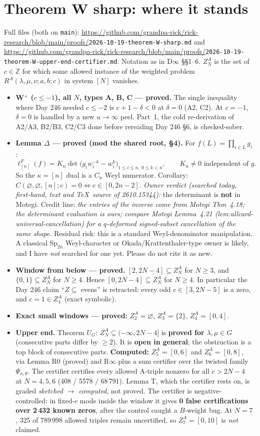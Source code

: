 \documentclass[10pt]{article}
\newcommand{\RR}{\url{https://github.com/grandpa-rick/rick-research/blob/main/proofs/}}
\begin{document}
\section{Theorem W sharp: where it stands}
Full files (both on \texttt{main}):
\RR\texttt{2026-10-19-theorem-W-sharp.md} and \RR\texttt{2026-10-19-theorem-W-upper-end-certifier.md}.
Notation as in D$\infty$ \S\S1--6. $Z^A_N$ is the set of $c\in\mathbb Z$ for which some allowed instance of the weighted problem $R^A(\lambda,\mu,\nu;a,b;c)$ in system $[N]$ vanishes.
\begin{itemize}
\item \textbf{W$^+$ ($c\le-1$), all $N$, types A, B, C --- proved.} The single inequality where Day 246 needed $c\le-2$ is $c+1-\delta<0$ at $\delta=0$ (A2, C2). At $c=-1$, $\delta=0$ is handled by a new $u\to\infty$ peel. Part~1, the cold re-derivation of A2/A3, B2/B3, C2/C3 done before rereading Day 246 \S6, is checked-sober.
\item \textbf{Lemma $\Delta$ --- proved (mod the shared root, \S4).} For $f(L)=\prod_{i\in L}g_i$:
\[\ell^F_{[n]}(f)=K_n\det\big(g_iw_i^{-k}-w_i^{k}\big)_{1\le i\le n,\ 0\le k<n},\qquad K_n\neq0 \text{ independent of } g.\]
So the $\kappa=[n]$ dual is a $C_n$ Weyl numerator. Corollary: $C(\varnothing,\varnothing,[n];c)=0\iff c\in[0,2n-2]$.
\emph{Owner verdict (searched today, first-hand, text and \TeX\ source of 2610.15344):} the determinant is \textbf{not} in Motegi. Credit line: \emph{the entries of the inverse come from Motegi Thm~4.18; the determinant evaluation is ours; compare Motegi Lemma~4.21 (lem:allcard-universal-cancellation) for a $q$-deformed signed-subset cancellation of the same shape.} Residual risk: this is a standard Weyl-denominator manipulation. A classical $\mathrm{Sp}_{2n}$ Weyl-character or Okada/Krattenthaler-type owner is likely, and I have \emph{not} searched for one yet. Please do not cite it as new.
\item \textbf{Window from below --- proved.} $[2,2N-4]\subseteq Z^A_N$ for $N\ge3$, and $\{0,1\}\subseteq Z^A_N$ for $N\ge4$. Hence $[0,2N-4]\subseteq Z^A_N$ for $N\ge4$. In particular the Day 246 claim ``$Z\subseteq$ evens'' is retracted: every odd $c\in[3,2N-5]$ is a zero, and $c=1\in Z^A_4$ (exact symbolic).
\item \textbf{Exact small windows --- proved:} $Z^A_2=\varnothing$, $Z^A_3=\{2\}$, $Z^A_4=[0,4]$.
\item \textbf{Upper end.} Theorem $U_G$: $Z^A_N\subseteq(-\infty,2N-4]$ is \textbf{proved for $\lambda,\mu\in G$} (consecutive parts differ by $\ge2$). It is \textbf{open in general}; the obstruction is a top block of consecutive parts. \textbf{Computed:} $Z^A_5=[0,6]$ and $Z^A_6=[0,8]$, via Lemma R0 (proved) and R$\infty$ plus a sum certifier over the twisted family $\Psi_{\kappa,\theta}$. The certifier certifies every allowed A-triple nonzero for all $c>2N-4$ at $N=4,5,6$ (408 / 5578 / 68\,791). Lemma T, which the certifier rests on, is graded \emph{sketched $\to$ computed}, not proved. The certifier is negative-controlled: in fixed-$c$ mode inside the window it gives \textbf{0 false certifications over 2\,432 known zeros}, after the control caught a $B$-weight bug. At $N=7$, 325 of 789\,998 allowed triples remain uncertified, so $Z^A_7=[0,10]$ is \emph{not} claimed.
\end{itemize}
\end{document}
